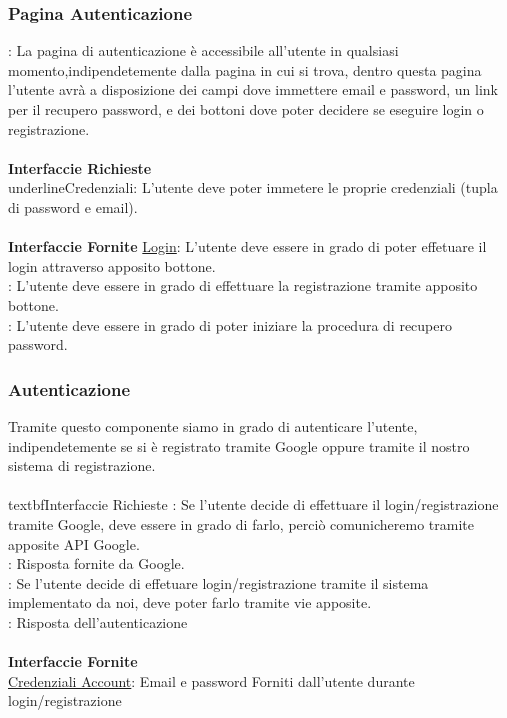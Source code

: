 \documentclass[11pt, a4paper]{article}
\theoremstyle{definition} %
\begin{document}
\subsubsection{Pagina Autenticazione}:
La pagina di autenticazione è accessibile all'utente in qualsiasi momento,indipendetemente dalla pagina in cui si trova, dentro questa pagina
l'utente avrà a disposizione dei campi dove immettere email e password, un link per il recupero password, e dei bottoni dove poter decidere se eseguire login o registrazione.
\\\\\textbf{Interfaccie Richieste}
\\underline{Credenziali}: L'utente deve poter immetere le proprie credenziali (tupla di password e email).
\\\\\textbf{Interfaccie Fornite}
\underline{Login}: L'utente deve essere in grado di poter effetuare il login attraverso apposito bottone.
\\
: L'utente deve essere in grado di effettuare la registrazione tramite apposito bottone.
\\
: L'utente deve essere in grado di poter iniziare la procedura di recupero password.
\subsubsection{Autenticazione}
Tramite questo componente siamo in grado di autenticare l'utente, indipendetemente se si è registrato tramite Google oppure tramite il nostro sistema di registrazione.
\\\\textbf{Interfaccie Richieste}
: Se l'utente decide di effettuare il login/registrazione tramite Google, deve essere in grado di farlo, perciò comunicheremo tramite apposite API Google.
\\
: Risposta fornite da Google.
\\
: Se l'utente decide di effetuare login/registrazione tramite il sistema implementato da noi, deve poter farlo tramite vie apposite.
\\
: Risposta dell'autenticazione
\\\\\textbf{Interfaccie Fornite}\\
\underline{Credenziali Account}: Email e password Forniti dall'utente durante login/registrazione
\end{document}
